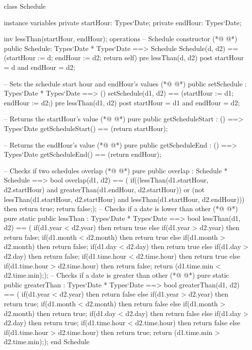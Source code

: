 \begin{vdmpp}[breaklines=true]
class Schedule

instance variables
  private startHour: Types`Date;
  private endHour: Types`Date;
  
  inv lessThan(startHour, endHour);
operations
 -- Schedule constructor
(*@
\label{Schedule:10}
@*)
 public Schedule: Types`Date * Types`Date ==> Schedule
  Schedule(d, d2) == (startHour := d; endHour := d2; return self)
 pre lessThan(d, d2)
 post startHour = d and endHour = d2;
 
 -- Sets the schedule start hour and endHour's values
(*@
\label{setSchedule:16}
@*)
 public setSchedule : Types`Date * Types`Date ==> ()
  setSchedule(d1, d2) == (startHour := d1; endHour := d2;)
 pre lessThan(d1, d2)
 post startHour = d1 and endHour = d2;
 
 -- Returns the startHour's value
(*@
\label{getScheduleStart:22}
@*)
 pure public getScheduleStart : () ==> Types`Date
  getScheduleStart() == (return startHour);
 
 -- Returns the endHour's value
(*@
\label{getScheduleEnd:26}
@*)
 pure public getScheduleEnd : () ==> Types`Date
  getScheduleEnd() == (return endHour);
 
 -- Checks if two schedules overlap
(*@
\label{overlap:30}
@*)
 pure public overlap : Schedule * Schedule ==> bool
  overlap(d1, d2) == (
          if((lessThan(d1.startHour, d2.startHour) and greaterThan(d1.endHour, d2.startHour)) or
          (not lessThan(d1.startHour, d2.startHour) and lessThan(d1.startHour, d2.endHour)))
           then return true;
          return false;);
 -- Checks if a date is lower than other
(*@
\label{lessThan:37}
@*)
 pure static public lessThan : Types`Date * Types`Date ==> bool
  lessThan(d1, d2) == (
          if(d1.year < d2.year)
           then return true
          else if(d1.year > d2.year)
           then return false;
          if(d1.month < d2.month)
           then return true
          else if(d1.month > d2.month)
           then return false;
          if(d1.day < d2.day)
           then return true
          else if(d1.day > d2.day)
           then return false;
          if(d1.time.hour < d2.time.hour)
           then return true
          else if(d1.time.hour > d2.time.hour)
           then return false;
          return (d1.time.min < d2.time.min););
 -- Checks if a date is greater than other         
(*@
\label{greaterThan:57}
@*)
 pure static public greaterThan : Types`Date * Types`Date ==> bool
  greaterThan(d1, d2) == (
          if(d1.year < d2.year)
           then return false
          else if(d1.year > d2.year)
           then return true;
          if(d1.month < d2.month)
           then return false
          else if(d1.month > d2.month)
           then return true;
          if(d1.day < d2.day)
           then return false
          else if(d1.day > d2.day)
           then return true;
          if(d1.time.hour < d2.time.hour)
           then return false
          else if(d1.time.hour > d2.time.hour)
           then return true;
          return (d1.time.min > d2.time.min););
end Schedule
\end{vdmpp}
